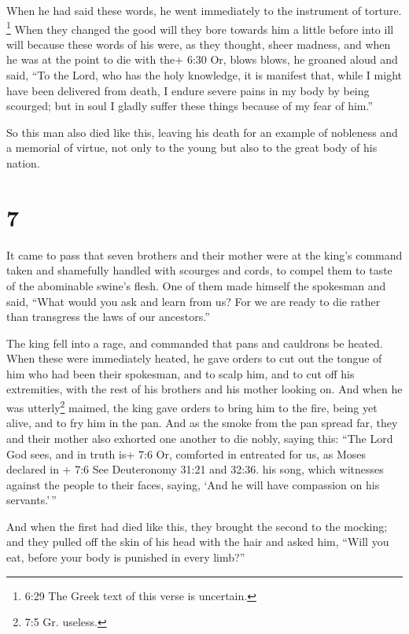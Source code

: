 When he had said these words, he went immediately to the instrument of
torture.  \footnote{6:29 The Greek text of this verse is
  uncertain.} When they changed the good will they bore towards him a
little before into ill will because these words of his were, as they
thought, sheer madness,  and when he was at the point to
die with the+ 6:30 Or, blows blows, he groaned aloud and said, ``To the
Lord, who has the holy knowledge, it is manifest that, while I might
have been delivered from death, I endure severe pains in my body by
being scourged; but in soul I gladly suffer these things because of my
fear of him.''

 So this man also died like this, leaving his death for an
example of nobleness and a memorial of virtue, not only to the young but
also to the great body of his nation.

\hypertarget{section-5}{%
\section{7}\label{section-5}}

 It came to pass that seven brothers and their mother were
at the king's command taken and shamefully handled with scourges and
cords, to compel them to taste of the abominable swine's flesh.
 One of them made himself the spokesman and said, ``What
would you ask and learn from us? For we are ready to die rather than
transgress the laws of our ancestors.''

 The king fell into a rage, and commanded that pans and
cauldrons be heated.  When these were immediately heated, he
gave orders to cut out the tongue of him who had been their spokesman,
and to scalp him, and to cut off his extremities, with the rest of his
brothers and his mother looking on.  And when he was
utterly\footnote{7:5 Gr. useless.} maimed, the king gave orders to bring
him to the fire, being yet alive, and to fry him in the pan. And as the
smoke from the pan spread far, they and their mother also exhorted one
another to die nobly, saying this:  ``The Lord God sees, and
in truth is+ 7:6 Or, comforted in entreated for us, as Moses declared in
+ 7:6 See Deuteronomy 31:21 and 32:36. his song, which witnesses against
the people to their faces, saying, `And he will have compassion on his
servants.'\,''

 And when the first had died like this, they brought the
second to the mocking; and they pulled off the skin of his head with the
hair and asked him, ``Will you eat, before your body is punished in
every limb?''

